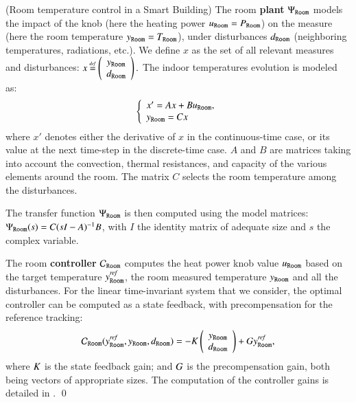 \documentclass[runningheads]{llncs}
\newcommand{\bydef}{\mathbin{\stackrel{\scriptscriptstyle\mathit{def}}{=}}}
\newcommand{\measure}[1][]{y\ifx#1\relax\else^{#1}\fi}
\newcommand{\knob}[1][]{u\ifx#1\relax\else^{#1}\fi}
\newcommand{\disturbance}[1][]{d\ifx#1\relax\else^{#1}\fi}
\newcommand{\plant}[1][]{\Psi\ifx#1\relax\else^{#1}\fi}
\newcommand{\controller}[1][]{\mathcal{C}\ifx#1\relax\else^{#1}\fi}
\newcommand{\temperature}[1][]{T\ifx#1\relax\else^{#1}\fi}
\newcommand{\controlgain}[1][]{K\ifx#1\relax\else^{#1}\fi}
\newcommand{\precomp}[1][]{G\ifx#1\relax\else^{#1}\fi}
\newcommand{\power}[1][]{P\ifx#1\relax\else^{#1}\fi}
\newcommand{\setpoint}[2][]{#2[{%
      \ifthenelse{\equal{#1}{}}{}{#1,}%
      \mathit{ref}%
  }]%
}
\newcommand{\predicatename}[1]{\mathtt{#1}}
\begin{document}
\begin{example}{(Room temperature control in a Smart Building)}
\label{ex:control-formulation}
The room \textbf{plant} \(\plant_{\predicatename{Room}}\) models the impact of the knob (here the heating power $\knob_{\predicatename{Room}}=\power_{\predicatename{Room}}$) on the measure (here the room temperature $\measure_{\predicatename{Room}} = \temperature_{\predicatename{Room}}$), under disturbances $\disturbance_{\predicatename{Room}}$ (neighboring temperatures, radiations, etc.). 
%
We define $x$ as the set of all relevant measures and disturbances:
$
    x \bydef \left(\begin{array}{c} \measure_{\predicatename{Room}} \\ \disturbance_{\predicatename{Room}} \end{array}\right).
$
The indoor temperatures evolution is modeled as:
\begin{equation}
\label{eq:room-ss-model}
\left\{
    \begin{array}{l}
        x' = A x + B \knob_{\predicatename{Room}}, \\
        \measure_{\predicatename{Room}} = C x
    \end{array}
\right.
\end{equation}
where $x'$ denotes either the derivative of $x$ in the continuous-time case, or its value at the next time-step in the discrete-time case. 
$A$ and $B$ are matrices taking into account the convection, thermal resistances, and capacity of the various elements around the room. The matrix $C$ selects the room temperature among the disturbances.

The transfer function \(\plant_{\predicatename{Room}}\) is then computed using the model matrices:
$
\plant_{\predicatename{Room}}(s) = C (s I -A) ^{-1} B
$,
with $I$ the identity matrix of adequate size and $s$ the complex variable. 

The room \textbf{controller} \( \controller_{\predicatename{Room}}\) computes the heat power knob value \(\knob_{\predicatename{Room}}\) based on the target temperature \(\setpoint{\measure}_{\predicatename{Room}}\), the room measured temperature \(\measure_{\predicatename{Room}}\) and all the disturbances. 
For the linear time-invariant system that we consider, the optimal controller can be computed as a state feedback, with precompensation for the reference tracking:
\begin{equation}
    \label{eq:ex:control:optimal}
    \controller_{\predicatename{Room}} (\setpoint{\measure}_{\predicatename{Room}},\measure_{\predicatename{Room}}, \disturbance_{\predicatename{Room}}) = -\controlgain \left(\begin{array}{c} \measure_{\predicatename{Room}} \\ \disturbance_{\predicatename{Room}} \end{array}\right) + \precomp \setpoint{\measure}_{\predicatename{Room}},
\end{equation}
where \( \controlgain \) is the state feedback gain; and \( \precomp \) is the precompensation gain, both being vectors of appropriate sizes. The computation of the controller gains is detailed in \cite{BCK26-Motifs}.
  \qed
\end{example}
\end{document}

